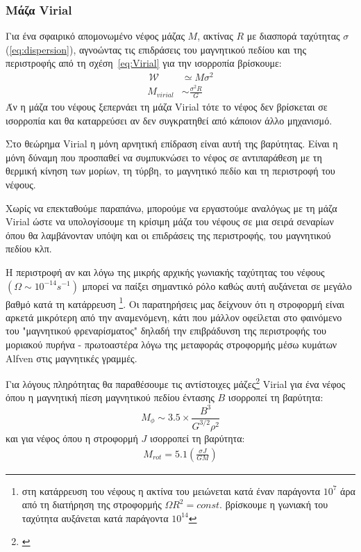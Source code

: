 \documentclass[a4paper,12pt]{memoir}
\newcommand{\WW}{\,\mathcal{W}}
\begin{document}
\subsubsection{Μάζα Virial}
\label{par:VirialMass}
Για ένα σφαιρικό απομονωμένο νέφος μάζας $M$, ακτίνας $R$ με διασπορά ταχύτητας $\sigma$ (\ref{eq:dispersion}), αγνοώντας τις επιδράσεις του μαγνητικού πεδίου και της περιστροφής από τη σχέση~\ref{eq:Virial} για την ισορροπία βρίσκουμε:
\begin{align}
\WW &\simeq M\sigma ^2 \\
M_{virial} &\sim \frac{\sigma ^2 R}{G} 
\end{align} 
Άν η μάζα του νέφους ξεπερνάει τη μάζα Virial τότε το νέφος δεν βρίσκεται σε ισορροπία και θα καταρρεύσει αν δεν συγκρατηθεί από κάποιον άλλο μηχανισμό.

Στο θεώρημα Virial η μόνη αρνητική επίδραση είναι αυτή της βαρύτητας. Είναι η μόνη δύναμη που προσπαθεί να συμπυκνώσει το νέφος σε αντιπαράθεση με τη θερμική κίνηση των μορίων, τη τύρβη, το μαγνητικό πεδίο και τη περιστροφή του νέφους.

Χωρίς να επεκταθούμε παραπάνω, μπορούμε να εργαστούμε αναλόγως με τη μάζα Virial ώστε να υπολογίσουμε τη κρίσιμη μάζα του νέφους σε μια σειρά σεναρίων όπου θα λαμβάνονταν υπόψη και οι επιδράσεις της περιστροφής, του μαγνητικού πεδίου κλπ.

Η περιστροφή αν και λόγω της μικρής αρχικής γωνιακής ταχύτητας του νέφους $(\Omega \sim 10^{-14} s^{-1})$ μπορεί να παίξει σημαντικό ρόλο καθώς αυτή αυξάνεται σε μεγάλο βαθμό κατά τη κατάρρευση \footnote{στη κατάρρευση του νέφους η ακτίνα του μειώνεται κατά έναν παράγοντα $10^7$ άρα από τη διατήρηση της στροφορμής $\Omega R^2 = const.$ βρίσκουμε η γωνιακή του ταχύτητα αυξάνεται κατά παράγοντα $10^{14}$}. Οι παρατηρήσεις μας δείχνουν ότι η στροφορμή είναι αρκετά μικρότερη από την αναμενόμενη, κάτι που μάλλον οφείλεται στο φαινόμενο του "μαγνητικού φρεναρίσματος" δηλαδή την επιβράδυνση της περιστροφής του μοριακού πυρήνα - πρωτοαστέρα λόγω της μεταφοράς στροφορμής μέσω κυμάτων Alfven στις μαγνητικές γραμμές.

Για λόγους πληρότητας θα παραθέσουμε τις αντίστοιχες μάζες\footnote{\cite{schulz_2012}} Virial για ένα νέφος όπου η μαγνητική πίεση μαγνητικού πεδίου έντασης $B$ ισορροπεί τη βαρύτητα:
\begin{equation}
M_{\phi} \sim 3.5 \times \frac{B^3}{G^{3/2} \rho^2} 
\end{equation}
και για νέφος όπου η στροφορμή $J$ ισορροπεί τη βαρύτητα:
\begin{align}
M_{rot} = 5.1 \left( \frac{\sigma J}{G M} \right) 
\end{align}
\end{document}
